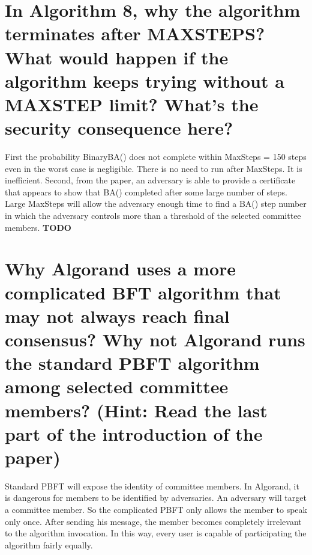 \documentclass{article}
\begin{document}
\section{In Algorithm 8, why the algorithm terminates after MAXSTEPS? What would
happen if the algorithm keeps trying without a MAXSTEP limit? What’s the
security consequence here?}
First the probability BinaryBA() does not complete within
MaxSteps = 150 steps even in the worst case is negligible.
There is no need to run after MaxSteps. It is inefficient.
Second, from the paper, an adversary is able to provide a certificate that appears to show
that BA() completed after some large number of steps. 
Large MaxSteps will allow the adversary enough time 
to find a BA() step number
in which the adversary controls more
than a threshold of the selected committee members. \textbf{TODO}
\section{Why Algorand uses a more complicated BFT algorithm that may not always reach
final consensus? Why not Algorand runs the standard PBFT algorithm among
selected committee members? (Hint: Read the last part of the introduction of the
paper)}
Standard PBFT will expose the identity of committee members.
In Algorand, it is dangerous for members to be identified by adversaries.
An adversary will target a committee member. So the complicated PBFT 
only allows the member to speak only once. After sending his message,
the member becomes completely irrelevant to the algorithm invocation.
In this way, every user is capable of participating the algorithm 
fairly equally.
\end{document}
